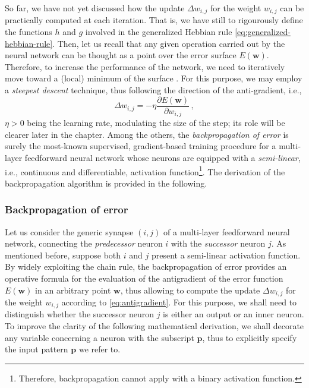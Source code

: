 \documentclass[12pt, a4paper, twoside, openright]{report}
\numberwithin{equation}{chapter}
\theoremstyle{theorem}
\theoremstyle{definition}
\theoremstyle{remark}
\theoremstyle{proposition}
\numberwithin{figure}{chapter}
\begin{document}
		So far, we have not yet discussed how the update $\Delta w_{i,j}$ for the weight $w_{i,j}$ can be practically computed at each iteration. That is, we have still to rigourously define the functions $h$ and $g$ involved in the generalized Hebbian rule \eqref{eq:generalized-hebbian-rule}. Then, let us recall that any given operation carried out by the neural network can be thought as a point over the error surface $E(\boldsymbol{w})$. Therefore, to increase the performance of the network, we need to iteratively move toward a (local) minimum of the surface \cite{Hay05}. For this purpose, we may employ a \emph{steepest descent} technique, thus following the direction of the anti-gradient, i.e.,
		\begin{equation}
			\label{eq:antigradient}
			\Delta w_{i,j} = - \eta \dfrac{\partial E(\boldsymbol{w})}{\partial w_{i,j}} \, ,
		\end{equation}
		$\eta > 0$ being the learning rate, modulating the size of the step; its role will be clearer later in the chapter. Among the others, the \emph{backpropagation of error} \cite{MR86} is surely the most-known supervised, gradient-based training procedure for a multi-layer feedforward neural network whose neurons are equipped with a \emph{semi-linear}, i.e., continuous and differentiable, activation function\footnote{Therefore, backpropagation cannot apply with a binary activation function.}. The derivation of the backpropagation algorithm is provided in the following.
		
	\subsubsection{Backpropagation of error}
	\label{section:Backpropagation of error}
		
		Let us consider the generic synapse $(i,j)$ of a multi-layer feedforward neural network, connecting the \emph{predecessor} neuron $i$ with the \emph{successor} neuron $j$. As mentioned before, suppose both $i$ and $j$ present a semi-linear activation function. By widely exploiting the chain rule, the backpropagation of error provides an operative formula for the evaluation of the antigradient of the error function $E(\boldsymbol{w})$ in an arbitrary point $\boldsymbol{w}$, thus allowing to compute the update $\Delta w_{i,j}$ for the weight $w_{i,j}$ according to \eqref{eq:antigradient}. For this purpose, we shall need to distinguish whether the successor neuron $j$ is either an output or an inner neuron. To improve the clarity of the following mathematical derivation, we shall decorate any variable concerning a neuron with the subscript $\boldsymbol{p}$, thus to explicitly specify the input pattern $\boldsymbol{p}$ we refer to.
		
\end{document}
